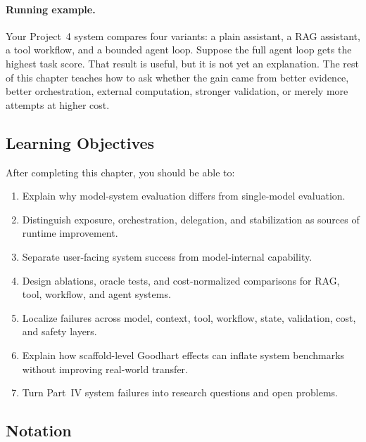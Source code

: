 \paragraph{Running example.} Your Project~4 system compares four variants: a plain assistant, a RAG assistant, a tool workflow, and a bounded agent loop. Suppose the full agent loop gets the highest task score. That result is useful, but it is not yet an explanation. The rest of this chapter teaches how to ask whether the gain came from better evidence, better orchestration, external computation, stronger validation, or merely more attempts at higher cost.

\subsection*{Learning Objectives}

After completing this chapter, you should be able to:

\begin{enumerate}
  \item Explain why model-system evaluation differs from single-model evaluation.
  \item Distinguish exposure, orchestration, delegation, and stabilization as sources of runtime improvement.
  \item Separate user-facing system success from model-internal capability.
  \item Design ablations, oracle tests, and cost-normalized comparisons for RAG, tool, workflow, and agent systems.
  \item Localize failures across model, context, tool, workflow, state, validation, cost, and safety layers.
  \item Explain how scaffold-level Goodhart effects can inflate system benchmarks without improving real-world transfer.
  \item Turn Part~IV system failures into research questions and open problems.
\end{enumerate}

\subsection*{Notation}

